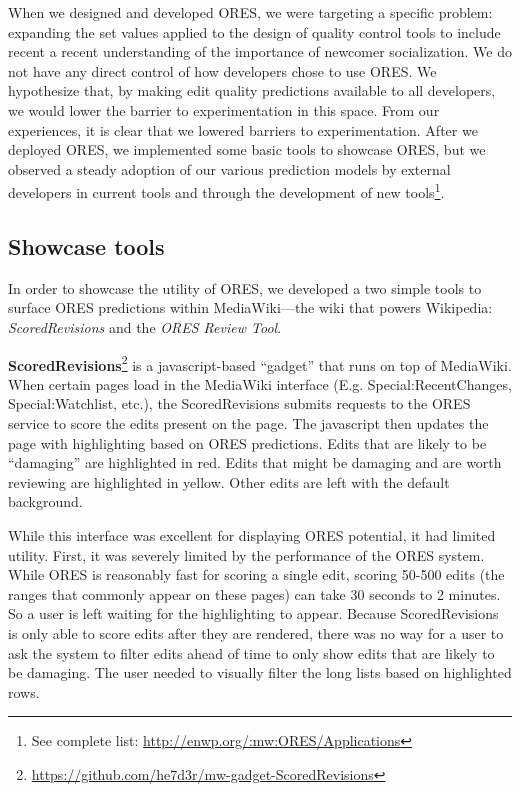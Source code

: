 When we designed and developed ORES, we were targeting a specific problem: expanding the set values applied to the design of quality control tools to include recent a recent understanding of the importance of newcomer socialization.  We do not have any direct control of how developers chose to use ORES.  We hypothesize that, by making edit quality predictions available to all developers, we would lower the barrier to experimentation in this space.  From our experiences, it is clear that we lowered barriers to experimentation.  After we deployed ORES, we implemented some basic tools to showcase ORES, but we observed a steady adoption of our various prediction models by external developers in current tools and through the development of new tools\footnote{See complete list: \url{http://enwp.org/:mw:ORES/Applications}}.

\subsection{Showcase tools}
In order to showcase the utility of ORES, we developed a two simple tools to surface ORES predictions within MediaWiki---the wiki that powers Wikipedia: \emph{ScoredRevisions} and the \emph{ORES Review Tool}.

\textbf{ScoredRevisions}\footnote{\url{https://github.com/he7d3r/mw-gadget-ScoredRevisions}} is a javascript-based ``gadget'' that runs on top of MediaWiki.  When certain pages load in the MediaWiki interface (E.g. Special:RecentChanges, Special:Watchlist, etc.), the ScoredRevisions submits requests to the ORES service to score the edits present on the page.  The javascript then updates the page with highlighting based on ORES predictions.  Edits that are likely to be ``damaging'' are highlighted in red.  Edits that might be damaging and are worth reviewing are highlighted in yellow.  Other edits are left with the default background.

While this interface was excellent for displaying ORES potential, it had limited utility.  First, it was severely limited by the performance of the ORES system.  While ORES is reasonably fast for scoring a single edit, scoring 50-500 edits (the ranges that commonly appear on these pages) can take 30 seconds to 2 minutes.  So a user is left waiting for the highlighting to appear.  Because ScoredRevisions is only able to score edits after they are rendered, there was no way for a user to ask the system to filter edits ahead of time to only show edits that are likely to be damaging.  The user needed to visually filter the long lists based on highlighted rows.

